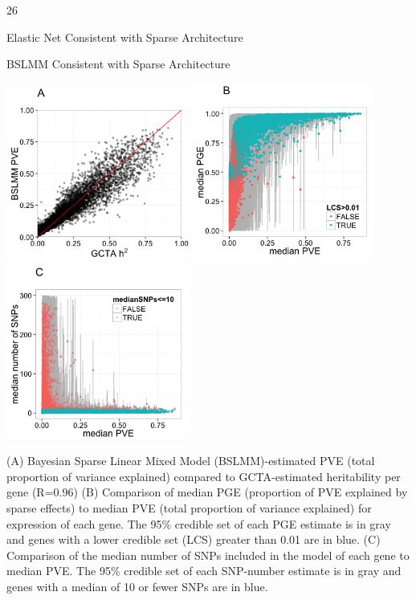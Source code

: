 \documentclass[final]{beamer}
\newcommand{\ColWidth}{26}
\begin{document}
\begin{frame}{}
\begin{textblock}{\ColWidth}
\begin{block}{Elastic Net Consistent with Sparse Architecture}
\end{block}
\begin{block}{BSLMM Consistent with Sparse Architecture}
	\begin{center}
		\includegraphics[width=0.45\textwidth]{plots/Fig-DGN-BSLMM-A.png}
		\includegraphics[width=0.45\textwidth]{plots/Fig-DGN-BSLMM-B.png}\\
		\includegraphics[width=0.45\textwidth]{plots/Fig-DGN-BSLMM-C.png}\\
	 \end{center}
	{\tiny (A) Bayesian Sparse Linear Mixed Model (BSLMM)-estimated PVE (total proportion of variance explained) compared to GCTA-estimated heritability per gene (R=0.96) (B) Comparison of median PGE (proportion of PVE explained by sparse effects) to median PVE (total proportion of variance explained) for expression of each gene. The 95\% credible set of each PGE estimate is in gray and genes with a lower credible set (LCS) greater than 0.01 are in blue. (C) Comparison of the median number of SNPs included in the model of each gene to median PVE. The 95\% credible set of each SNP-number estimate is in gray and genes with a median of 10 or fewer SNPs are in blue.\\}
\end{block}



\end{textblock}
\end{frame}
\end{document}
